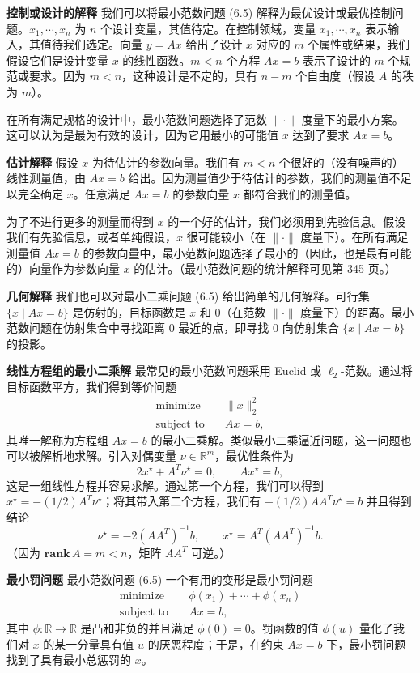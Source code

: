 \documentclass[UTF8,12pt,a4paper,fontset=fandol]{ctexart}
\begin{document}
\noindent\textbf{控制或设计的解释}\quad
我们可以将最小范数问题 (6.5) 解释为最优设计或最优控制问题。$x_1,\cdots,x_n$ 为 $n$ 个设计变量，其值待定。在控制领域，变量 $x_1,\cdots,x_n$ 表示输入，其值待我们选定。向量 $y=Ax$ 给出了设计 $x$ 对应的 $m$ 个属性或结果，我们假设它们是设计变量 $x$ 的线性函数。$m<n$ 个方程 $Ax=b$ 表示了设计的 $m$ 个规范或要求。因为 $m<n$，这种设计是不定的，具有 $n-m$ 个自由度（假设 $A$ 的秩为 $m$）。

在所有满足规格的设计中，最小范数问题选择了范数 $\|\cdot\|$ 度量下的最小方案。这可以认为是最为有效的设计，因为它用最小的可能值 $x$ 达到了要求 $Ax=b$。

\noindent\textbf{估计解释}\quad
假设 $x$ 为待估计的参数向量。我们有 $m<n$ 个很好的（没有噪声的）线性测量值，由 $Ax=b$ 给出。因为测量值少于待估计的参数，我们的测量值不足以完全确定 $x$。任意满足 $Ax=b$ 的参数向量 $x$ 都符合我们的测量值。

为了不进行更多的测量而得到 $x$ 的一个好的估计，我们必须用到先验信息。假设我们有先验信息，或者单纯假设，$x$ 很可能较小（在 $\|\cdot\|$ 度量下）。在所有满足测量值 $Ax=b$ 的参数向量中，最小范数问题选择了最小的（因此，也是最有可能的）向量作为参数向量 $x$ 的估计。（最小范数问题的统计解释可见第 345 页。）

\noindent\textbf{几何解释}\quad
我们也可以对最小二乘问题 (6.5) 给出简单的几何解释。可行集 $\{x\mid Ax=b\}$ 是仿射的，目标函数是 $x$ 和 0（在范数 $\|\cdot\|$ 度量下）的距离。最小范数问题在仿射集合中寻找距离 0 最近的点，即寻找 0 向仿射集合 $\{x\mid Ax=b\}$ 的投影。

\noindent\textbf{线性方程组的最小二乘解}\quad
最常见的最小范数问题采用 Euclid 或 $\ell_2$-范数。通过将目标函数平方，我们得到等价问题
\[
\begin{aligned}
\text{minimize}\quad & \|x\|_2^2\\
\text{subject to}\quad & Ax=b,
\end{aligned}
\]
其唯一解称为方程组 $Ax=b$ 的最小二乘解。类似最小二乘逼近问题，这一问题也可以被解析地求解。引入对偶变量 $\nu\in\mathbb{R}^m$，最优性条件为
\[
2x^\star+A^T\nu^\star=0,\qquad Ax^\star=b,
\]
这是一组线性方程并容易求解。通过第一个方程，我们可以得到 $x^\star=-(1/2)A^T\nu^\star$；将其带入第二个方程，我们有 $-(1/2)AA^T\nu^\star=b$ 并且得到结论
\[
\nu^\star=-2(AA^T)^{-1}b,\qquad x^\star=A^T(AA^T)^{-1}b.
\]
（因为 $\mathbf{rank}\,A=m<n$，矩阵 $AA^T$ 可逆。）

\noindent\textbf{最小罚问题}\quad
最小范数问题 (6.5) 一个有用的变形是最小罚问题
\begin{equation}
\begin{aligned}
\text{minimize}\quad & \phi(x_1)+\cdots+\phi(x_n)\\
\text{subject to}\quad & Ax=b,
\end{aligned}
\tag{6.6}
\end{equation}
其中 $\phi:\mathbb{R}\to\mathbb{R}$ 是凸和非负的并且满足 $\phi(0)=0$。罚函数的值 $\phi(u)$ 量化了我们对 $x$ 的某一分量具有值 $u$ 的厌恶程度；于是，在约束 $Ax=b$ 下，最小罚问题找到了具有最小总惩罚的 $x$。
\end{document}
